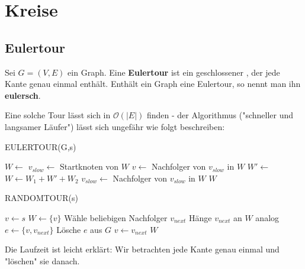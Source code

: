 \documentclass[a4paper]{report}
\begin{document}
\chapter{Kreise}
\section{Eulertour}
\begin{definition}
    Sei $G = (V,E)$ ein Graph. Eine \textbf{Eulertour} ist ein geschlossener , der jede Kante genau
    einmal enthält. Enthält ein Graph eine Eulertour, so nennt man ihn \textbf{eulersch}.
\end{definition}
\bigskip

Eine solche Tour lässt sich in $\mathcal{O}(|E|)$ finden - der Algorithmus ("schneller und langsamer Läufer")
lässt sich ungefähr wie folgt beschreiben:

\begin{algorithm}
    \caption{EULERTOUR(G,s)}
    \begin{algorithmic}[1]
        \State $W \leftarrow$  
        \State $v_{slow} \leftarrow $ Startknoten von $W$ 
            \State $v \leftarrow$ Nachfolger von $v_{slow}$ in $W$
             
                \State $W' \leftarrow$ 
                \State $W \leftarrow W_1 + W' + W_2$
            \EndIf
            \State $v_{slow} \leftarrow $ Nachfolger von $v_{slow}$ in $W$
        \EndWhile
        \Return $W$
    \end{algorithmic}
\end{algorithm}

\begin{algorithm}
    \caption{RANDOMTOUR(s)}
    \begin{algorithmic}[1]
        \State $v \leftarrow s$
        \State $W \leftarrow \{v\}$
         
            \State Wähle beliebigen Nachfolger $v_{next}$
            \State Hänge $v_{next}$ an $W$ analog
            \State $e \leftarrow \{v, v_{next}\}$
            \State Lösche $e$ aus $G$
            \State $v \leftarrow v_{next}$
        \EndWhile
        \State \Return $W$
    \end{algorithmic}
\end{algorithm}

Die Laufzeit ist leicht erklärt: Wir betrachten jede Kante genau einmal und "löschen" sie danach.
\end{document}
